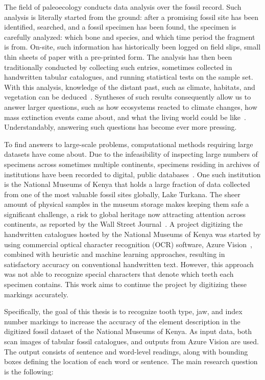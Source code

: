 \documentclass[english,twoside,openright]{UH_DS_MSc}
\begin{document}
The field of paleoecology conducts data analysis over the fossil record.
Such analysis is literally started from the ground: after a promising fossil site has been identified, searched, and a fossil specimen has been found, the specimen is 
carefully analyzed: which bone and species, and which time period the fragment is from. On-site, such information has historically been logged on field slips, small thin sheets of 
paper with a pre-printed form. The analysis has then been traditionally conducted by 
collecting such entries, sometimes collected in handwritten tabular catalogues, and running statistical 
tests on the sample set. With this analysis, knowledge of the distant past, such as climate, habitats, and 
vegetation can be deduced~\cite{Faith_Lyman_2019}. Syntheses of such results consequently allow us to 
answer larger questions, such as how ecosystems reacted to climate changes, how mass extinction events 
came about, and what the living world could be like~\cite{Zliobaite2023}. Understandably, answering such 
questions has become ever more pressing.

To find answers to large-scale problems, computational methods requiring large datasets have come about. Due to the infeasibility of inspecting large numbers of specimens across sometimes multiple 
continents, specimens residing in archives of institutions have been recorded to digital, public databases~\cite{uhenCardCatalogsComputers2013}.
One such institution is the National Museums of Kenya that holds a large fraction of data collected from one 
of the most valuable fossil sites globally, Lake Turkana. The sheer amount of physical samples in the museum storage
makes keeping them safe a significant challenge, a risk to global heritage now attracting attention across continents,
 as reported by the Wall Street Journal~\cite{hotzMuseumOverflowingPrehistoric2024}.
 A project digitizing the handwritten catalogues hosted by the National Museums of Kenya was started by
using commercial optical character recognition (OCR) software, Azure Vision~\cite{azurevision}, combined with heuristic and machine learning approaches, 
resulting in satisfactory accuracy on conventional handwritten text. However, this 
approach was not able to recognize special characters that denote which teeth each specimen contains. This work aims 
to continue the project by digitizing these markings accurately.

Specifically, the goal of this thesis is to recognize tooth type,
jaw, and index number markings to increase the accuracy of the element description in
the digitized fossil dataset of the National Museums of Kenya. As input data, both scan images of tabular fossil catalogues,
and outputs from Azure Vision are used.
The output consists of sentence and word-level readings, along with bounding boxes defining 
the location of each word or sentence. The main research question is the following: 
\end{document}
